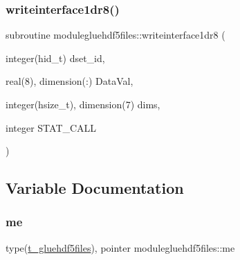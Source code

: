 \mbox{\label{namespacemodulegluehdf5files_a4828bbbb17a4c4d536a11e4a4c1c719b}} 
\subsubsection{\texorpdfstring{writeinterface1dr8()}{writeinterface1dr8()}}
{\footnotesize\ttfamily subroutine modulegluehdf5files\+::writeinterface1dr8 (\begin{DoxyParamCaption}\item[{integer(hid\+\_\+t)}]{dset\+\_\+id,  }\item[{real(8), dimension(\+:)}]{Data\+Val,  }\item[{integer(hsize\+\_\+t), dimension(7)}]{dims,  }\item[{integer}]{S\+T\+A\+T\+\_\+\+C\+A\+LL }\end{DoxyParamCaption})\hspace{0.3cm}{\ttfamily [private]}}



\subsection{Variable Documentation}
\mbox{\label{namespacemodulegluehdf5files_a6bfec83bc34daf2b7b6eb91ee72f586f}} 
\subsubsection{\texorpdfstring{me}{me}}
{\footnotesize\ttfamily type(\mbox{\hyperlink{structmodulegluehdf5files_1_1t__gluehdf5files}{t\+\_\+gluehdf5files}}), pointer modulegluehdf5files\+::me\hspace{0.3cm}{\ttfamily [private]}}

